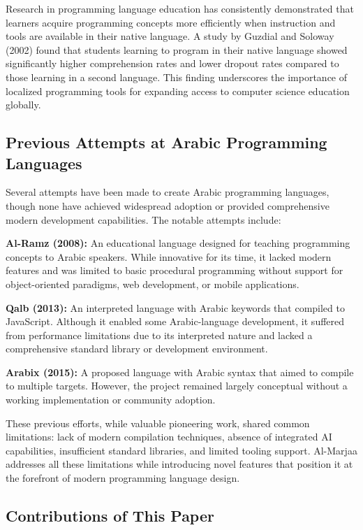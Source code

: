 \documentclass[11pt,a4paper]{article}
\begin{document}
Research in programming language education has consistently demonstrated that learners acquire programming concepts more efficiently when instruction and tools are available in their native language. A study by Guzdial and Soloway (2002) found that students learning to program in their native language showed significantly higher comprehension rates and lower dropout rates compared to those learning in a second language. This finding underscores the importance of localized programming tools for expanding access to computer science education globally.

\subsection{Previous Attempts at Arabic Programming Languages}

Several attempts have been made to create Arabic programming languages, though none have achieved widespread adoption or provided comprehensive modern development capabilities. The notable attempts include:

\textbf{Al-Ramz (2008):} An educational language designed for teaching programming concepts to Arabic speakers. While innovative for its time, it lacked modern features and was limited to basic procedural programming without support for object-oriented paradigms, web development, or mobile applications.

\textbf{Qalb (2013):} An interpreted language with Arabic keywords that compiled to JavaScript. Although it enabled some Arabic-language development, it suffered from performance limitations due to its interpreted nature and lacked a comprehensive standard library or development environment.

\textbf{Arabix (2015):} A proposed language with Arabic syntax that aimed to compile to multiple targets. However, the project remained largely conceptual without a working implementation or community adoption.

These previous efforts, while valuable pioneering work, shared common limitations: lack of modern compilation techniques, absence of integrated AI capabilities, insufficient standard libraries, and limited tooling support. Al-Marjaa addresses all these limitations while introducing novel features that position it at the forefront of modern programming language design.

\subsection{Contributions of This Paper}
\end{document}
